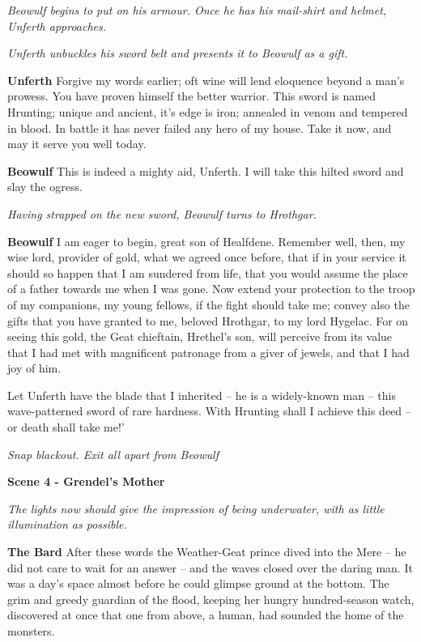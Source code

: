 \documentclass[a4paper]{article}
\begin{document}
{\centerline{\textit{Beowulf begins to put on his armour. Once he has his mail-shirt and helmet, Unferth approaches.}}
\centerline{\textit{Unferth unbuckles his sword belt and presents it to Beowulf as a gift.}}

\textbf{Unferth} Forgive my words earlier;
oft wine will lend eloquence beyond a man's prowess.
You have proven himself the better warrior.
This sword is named Hrunting; unique and ancient,
it's edge is iron; annealed in venom and tempered in blood.
In battle it has never failed any hero of my house.
Take it now, and may it serve you well today. 

\textbf{Beowulf} This is indeed a mighty aid, Unferth.
I will take this hilted sword and slay the ogress.

\centerline{\textit{Having strapped on the new sword, Beowulf turns to Hrothgar.}}

\textbf{Beowulf} I am eager to begin, great son of Healfdene.
Remember well, then, my wise lord,
provider of gold, what we agreed once before,
that if in your service it should so happen
that I am sundered from life, that you would assume the place
of a father towards me when I was gone.
Now extend your protection to the troop of my companions,
my young fellows, if the fight should take me;
convey also the gifts that you have granted to me,
beloved Hrothgar, to my lord Hygelac.
For on seeing this gold, the Geat chieftain,
Hrethel’s son, will perceive from its value
that I had met with magnificent patronage
from a giver of jewels, and that I had joy of him.

Let Unferth have the blade that I inherited
– he is a widely-known man – this wave-patterned sword
of rare hardness. With Hrunting shall I
achieve this deed – or death shall take me!’

\centerline{\textit{Snap blackout. Exit all apart from Beowulf}}

\centerline{\textbf{Scene 4 - Grendel's Mother}}

\centerline{\textit{The lights now should give the impression of being underwater, with as little illumination as possible.}}

\textbf{The Bard} After these words the Weather-Geat prince
dived into the Mere – he did not care
to wait for an answer – and the waves closed over
the daring man. It was a day’s space almost
before he could glimpse ground at the bottom.
The grim and greedy guardian of the flood,
keeping her hungry hundred-season watch,
discovered at once that one from above,
a human, had sounded the home of the monsters.

}
\end{document}
